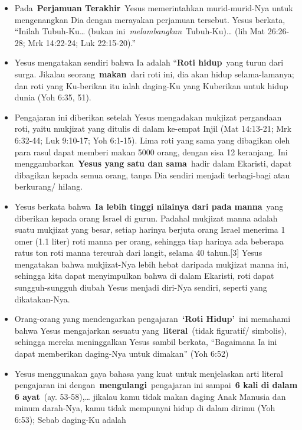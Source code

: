 \begin{itemize}
\item Pada~\textbf{Perjamuan Terakhir}~Yesus memerintahkan
murid-murid-Nya untuk mengenangkan Dia dengan merayakan perjamuan
tersebut. Yesus berkata, {\textquotedblleft}Inilah Tubuh-Ku{\dots}
(bukan ini~\emph{melambangkan}~Tubuh-Ku){\dots} (lih Mat 26:26-28; Mrk
14:22-24; Luk 22:15-20).{\textquotedblright}
\item Yesus mengatakan sendiri bahwa Ia adalah
{\textquotedblleft}\textbf{Roti hidup}~yang turun dari surga. Jikalau
seorang~\textbf{makan}~dari roti ini, dia akan hidup selama-lamanya;
dan roti yang Ku-berikan itu ialah daging-Ku yang Kuberikan untuk hidup
dunia (Yoh 6:35, 51).
\item Pengajaran ini diberikan setelah Yesus mengadakan mukjizat
pergandaan roti, yaitu mukjizat yang ditulis di dalam ke-empat Injil
(Mat 14:13-21; Mrk 6:32-44; Luk 9:10-17; Yoh 6:1-15). Lima roti yang
sama yang dibagikan oleh para rasul dapat memberi makan 5000 orang,
dengan sisa 12 keranjang. Ini menggambarkan~\textbf{Yesus yang satu dan
sama}~hadir dalam Ekaristi, dapat dibagikan kepada semua orang, tanpa
Dia sendiri menjadi terbagi-bagi atau berkurang/ hilang.
\item Yesus berkata bahwa~\textbf{Ia lebih tinggi nilainya dari pada
manna}~yang diberikan kepada orang Israel di gurun. Padahal mukjizat
manna adalah suatu mukjizat yang besar, setiap harinya berjuta orang
Israel menerima 1 omer (1.1 liter) roti manna per orang, sehingga tiap
harinya ada beberapa ratus ton roti manna tercurah dari langit, selama
40 tahun.[3] Yesus mengatakan bahwa mukjizat-Nya lebih hebat daripada
mukjizat manna ini, sehingga kita dapat menyimpulkan bahwa di dalam
Ekaristi, roti dapat sungguh-sungguh diubah Yesus menjadi diri-Nya
sendiri, seperti yang dikatakan-Nya.
\item Orang-orang yang mendengarkan
pengajaran~\textbf{{\textquoteleft}}\textbf{Roti
Hidup{\textquoteright}}~ini memahami bahwa Yesus mengajarkan sesuatu
yang~\textbf{literal}~(tidak figuratif/ simbolis), sehingga mereka
meninggalkan Yesus sambil berkata, {\textquotedblleft}Bagaimana Ia ini
dapat memberikan daging-Nya untuk dimakan{\textquotedblright} (Yoh
6:52)
\item Yesus menggunakan gaya bahasa yang kuat untuk menjelaskan arti
literal pengajaran ini dengan~\textbf{mengulangi}~pengajaran ini
sampai~\textbf{6 kali di dalam 6 ayat}~(ay. 53-58),{\dots} jikalau kamu
tidak makan daging Anak Manusia dan minum darah-Nya, kamu tidak
mempunyai hidup di dalam dirimu (Yoh 6:53); Sebab daging-Ku adalah

\end{itemize}

